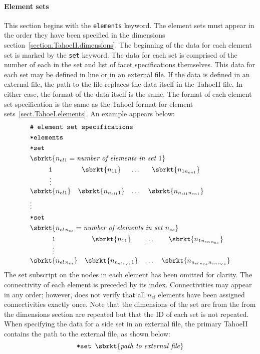 \paragraph{Element sets}
This section begins with the \texttt{elements} keyword.
The element sets must appear in the order they have been specified in 
the dimensions section~\ref{section.TahoeII.dimensions}. The 
beginning of the data for each element set is marked by the \texttt{set} 
keyword. The data for each set is comprised of the number of each in 
the set and list of facet specifications themselves. 
This data for each set may be 
defined in line or in an external file. If the data is defined in an 
external file, the path to the file replaces the data itself in the 
TahoeII file. In either case, the format of the data itself is the 
same. The format of each element set specification is the same as the TahoeI 
format for element sets~\ref{sect.TahoeI.elements}. An example appears 
below:
\begin{align}
& \texttt{\# element set specifications} \notag \\
& \texttt{*elements} \notag \\
& \texttt{*set} \notag \\
& \sbrkt{n_{el1} = \textit{number of elements in set~}1} \notag \\
& \begin{matrix}
\texttt{1} & \sbrkt{n_{11}} & \dots  & \sbrkt{n_{1n_{en1}}} \\
\vdots \\
\sbrkt{n_{el1}} & \sbrkt{n_{n_{el1}1}} & \dots  & \sbrkt{n_{n_{el1}n_{en1}}}
\end{matrix} \notag \\
& \vdots \notag \\
& \texttt{*set} \notag \\
& \sbrkt{n_{el\,n_{es}} = \textit{number of elements in set~}n_{es}} \notag \\
& \begin{matrix}
\texttt{1} & \sbrkt{n_{11}} & \dots  & \sbrkt{n_{1n_{en\,n_{es}}}} \\
\vdots \\
\sbrkt{n_{el\,n_{es}}} & \sbrkt{n_{n_{el\,n_{es}}1}} & \dots  & 
\sbrkt{n_{n_{el\,n_{es}}n_{en\,n_{es}}}}
\end{matrix} \notag
\end{align}
The set subscript on the nodes in each element has been omitted for 
clarity.
The connectivity of each element is preceded by its index. 
Connectivities may appear in any order; 
however, \tahoe does not verify that all $n_{el}$ 
elements have been assigned connectivities exactly once.
Note that the dimensions of the set are from the from the dimensions 
section are repeated but that the ID of each set is not repeated.
When specifying the data for a side set in an external file, the 
primary TahoeII contains the path to the external file, as shown below:
\[
\texttt{*set~} \sbrkt{\textrm{\textit{path to external file}}}
\]

